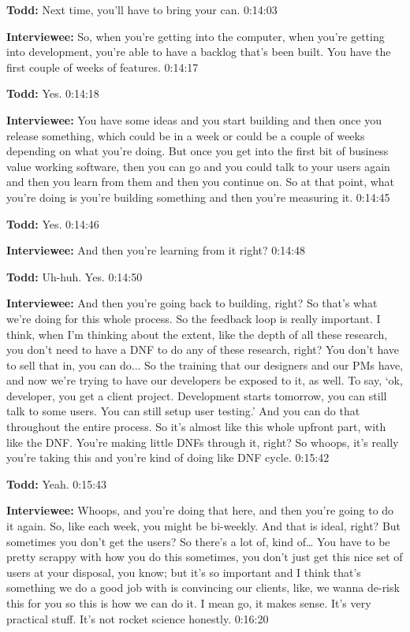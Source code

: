 \textbf{Todd:} Next time, you'll have to bring your can.  0:14:03

\textbf{Interviewee:} So, when you're getting into the computer, when you're getting into development, you're able to have a backlog that's been built.  You have the first couple of weeks of features.   0:14:17

\textbf{Todd:} Yes.  0:14:18

\textbf{Interviewee:} You have some ideas and you start building and then once you release something, which could be in a week or could be a couple of weeks depending on what you're doing.  But once you get into the first bit of business value working software, then you can go and you could talk to your users again and then you learn from them and then you continue on.  So at that point, what you're doing is you're building something and then you're measuring it.    0:14:45

\textbf{Todd:} Yes.   0:14:46

\textbf{Interviewee:} And then you're learning from it right?   0:14:48

\textbf{Todd:} Uh-huh. Yes.  0:14:50

\textbf{Interviewee:} And then you're going back to building, right? So that's what we're doing for this whole process. So the feedback loop is really important.  I think, when I'm thinking about the extent, like the depth of all these research, you don't need to have a DNF to do any of these research, right?  You don't have to sell that in, you can do...  So the training that our designers and our PMs have, and now we're trying to have our developers be exposed to it, as well.  To say, ‘ok, developer, you get a client project. Development starts tomorrow, you can still talk to some users.  You can still setup user testing.'  And you can do that throughout the entire process.  So it's almost like this whole upfront part, with like the DNF.  You're making little DNFs through it, right?  So whoops, it's really you're taking this and you're kind of doing like DNF cycle.   0:15:42

\textbf{Todd:} Yeah.   0:15:43

\textbf{Interviewee:} Whoops, and you're doing that here, and then you're going to do it again. So, like each week, you might be bi-weekly.   And that is ideal, right?  But sometimes you don't get the users?  So there's a lot of, kind of…  You have to be pretty scrappy with how you do this sometimes, you don't just get this nice set of users at your disposal, you know; but it's so important and I think that's something we do a good job with is convincing our clients, like, we wanna de-risk this for you so this is how we can do it.  I mean go, it makes sense.  It's very practical stuff.  It's not rocket science honestly.   0:16:20

